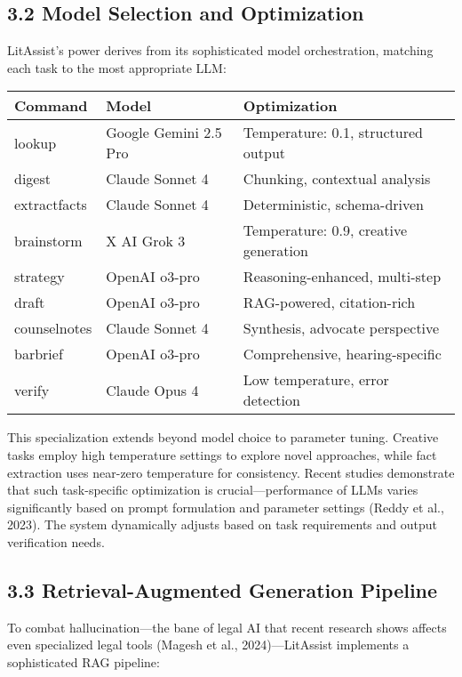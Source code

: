 \documentclass[12pt,a4paper]{article}
\begin{document}
\subsection*{3.2 Model Selection and Optimization}

LitAssist's power derives from its sophisticated model orchestration, matching each task to the most appropriate LLM:

\begin{center}
\begin{tabular}{|l|l|l|}
\hline
\textbf{Command} & \textbf{Model} & \textbf{Optimization} \\
\hline
lookup & Google Gemini 2.5 Pro & Temperature: 0.1, structured output \\
digest & Claude Sonnet 4 & Chunking, contextual analysis \\
extractfacts & Claude Sonnet 4 & Deterministic, schema-driven \\
brainstorm & X AI Grok 3 & Temperature: 0.9, creative generation \\
strategy & OpenAI o3-pro & Reasoning-enhanced, multi-step \\
draft & OpenAI o3-pro & RAG-powered, citation-rich \\
counselnotes & Claude Sonnet 4 & Synthesis, advocate perspective \\
barbrief & OpenAI o3-pro & Comprehensive, hearing-specific \\
verify & Claude Opus 4 & Low temperature, error detection \\
\hline
\end{tabular}
\end{center}

This specialization extends beyond model choice to parameter tuning. Creative tasks employ high temperature settings to explore novel approaches, while fact extraction uses near-zero temperature for consistency. Recent studies demonstrate that such task-specific optimization is crucial—performance of LLMs varies significantly based on prompt formulation and parameter settings (Reddy et al., 2023). The system dynamically adjusts based on task requirements and output verification needs.

\subsection*{3.3 Retrieval-Augmented Generation Pipeline}

To combat hallucination—the bane of legal AI that recent research shows affects even specialized legal tools (Magesh et al., 2024)—LitAssist implements a sophisticated RAG pipeline:
\end{document}
